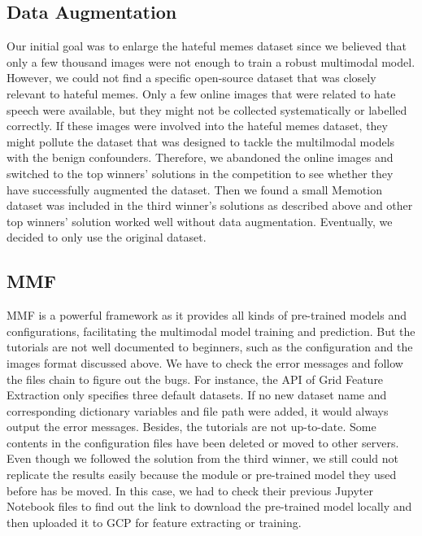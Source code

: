 \documentclass[10pt,twocolumn,letterpaper]{article}
\begin{document}
\subsection{Data Augmentation}
Our initial goal was to enlarge the hateful memes dataset since we believed that only a few thousand images were not enough to train a robust multimodal model. However, we could not find a specific open-source dataset that was closely relevant to hateful memes. Only a few online images that were related to hate speech were available, but they might not be collected systematically or labelled correctly. If these images were involved into the hateful memes dataset, they might pollute the dataset that was designed to tackle the multilmodal models with the benign confounders. Therefore, we abandoned the online images and switched to the top winners’ solutions in the competition to see whether they have successfully augmented the dataset. Then we found a small Memotion dataset was included in the third winner’s solutions as described above and other top winners’ solution worked well without data augmentation. Eventually, we decided to only use the original dataset.  

\subsection{MMF}
MMF is a powerful framework as it provides all kinds of pre-trained models and configurations, facilitating the multimodal model training and prediction. But the tutorials are not well documented to beginners, such as the configuration and the images format discussed above. We have to check the error messages and follow the files chain to figure out the bugs. For instance, the API of Grid Feature Extraction only specifies three default datasets. If no new dataset name and corresponding dictionary variables and file path were added, it would always output the error messages. Besides, the tutorials are not up-to-date. Some contents in the configuration files have been deleted or moved to other servers. Even though we followed the solution from the third winner, we still could not replicate the results easily because the module or pre-trained model they used before has be moved. In this case, we had to check their previous Jupyter Notebook files to find out the link to download the pre-trained model locally and then uploaded it to GCP for feature extracting or training. 
\end{document}

